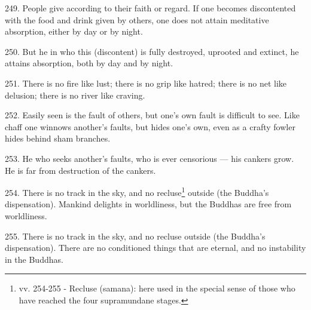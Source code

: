 249. People give according to their faith or regard. If one becomes discontented with the food and drink given by others, one does not attain meditative absorption, either by day or by night.

250. But he in who this (discontent) is fully destroyed, uprooted and extinct, he attains absorption, both by day and by night.

251. There is no fire like lust; there is no grip like hatred; there is no net like delusion; there is no river like craving.

252. Easily seen is the fault of others, but one's own fault is difficult to see. Like chaff one winnows another's faults, but hides one's own, even as a crafty fowler hides behind sham branches.

253. He who seeks another's faults, who is ever censorious — his cankers grow. He is far from destruction of the cankers.

254. There is no track in the sky, and no recluse\footnote{vv. 254-255 - Recluse (samana): here used in the special sense of those who have reached the four supramundane stages.} outside (the Buddha's dispensation). Mankind delights in worldliness, but the Buddhas are free from worldliness.

255. There is no track in the sky, and no recluse outside (the Buddha's dispensation). There are no conditioned things that are eternal, and no instability in the Buddhas.
